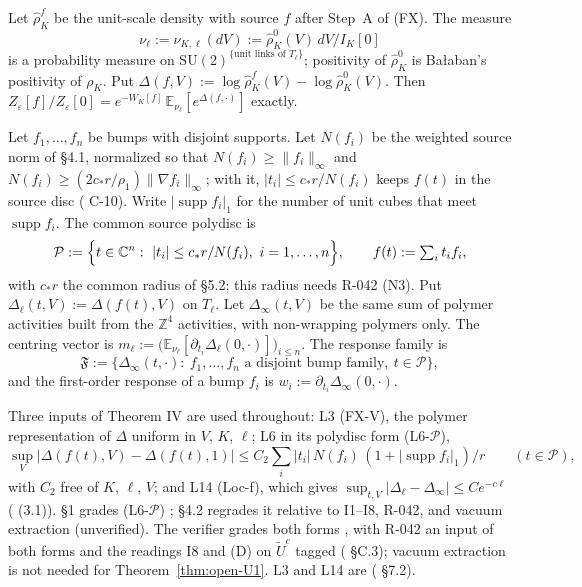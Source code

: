 \begin{definition}\label{def:open-nu}
Let $\hat\rho^f_K$ be the unit-scale density with source $f$ after Step~A of (FX). The measure
\[
\nu_\ell:=\nu_{K,\ell}(dV):=\hat\rho^0_K(V)\,dV\big/I_K[0]
\]
is a probability measure on $\mathrm{SU}(2)^{\{\text{unit links of }T_\ell\}}$; positivity of $\hat\rho^0_K$ is Ba{\l}aban's positivity of $\rho_K$. Put $\Delta(f,V):=\log\hat\rho^f_K(V)-\log\hat\rho^0_K(V)$. Then $Z_\varepsilon[f]/Z_\varepsilon[0]=e^{-W_K[f]}\,\mathbb E_{\nu_\ell}[e^{\Delta(f,\cdot)}]$ exactly.
\end{definition}

Let $f_1,\dots,f_n$ be bumps with disjoint supports. Let $N(f_i)$ be the weighted source norm of  \S4.1, normalized so that $N(f_i)\ge\|f_i\|_\infty$ and $N(f_i)\ge(2c_*r/\rho_1)\|\nabla f_i\|_\infty$; with it, $|t_i|\le c_*r/N(f_i)$ keeps $f(t)$ in the source disc ( C-10). Write $|\operatorname{supp}f_i|_1$ for the number of unit cubes that meet $\operatorname{supp}f_i$. The common source polydisc is
\[
\mathcal P:=\Bigl\{t\in\mathbb C^n:\ |t_i|\le c_*r/N(f_i),\ i=1,\dots,n\Bigr\},\qquad f(t):=\textstyle\sum_it_if_i,
\]
with $c_*r$ the common radius of  \S5.2; this radius needs R-042 (N3). Put $\Delta_\ell(t,V):=\Delta(f(t),V)$ on $T_\ell$. Let $\Delta_\infty(t,V)$ be the same sum of polymer activities built from the $\mathbb Z^4$ activities, with non-wrapping polymers only. The centring vector is $m_\ell:=\bigl(\mathbb E_{\nu_\ell}[\partial_{t_i}\Delta_\ell(0,\cdot)]\bigr)_{i\le n}$. The response family is
\[
\mathfrak F:=\bigl\{\Delta_\infty(t,\cdot):\ f_1,\dots,f_n\text{ a disjoint bump family},\ t\in\mathcal P\bigr\},
\]
and the first-order response of a bump $f_i$ is $w_i:=\partial_{t_i}\Delta_\infty(0,\cdot)$.

Three inputs of Theorem IV are used throughout: L3 (FX-V), the polymer representation of $\Delta$ uniform in $V$, $K$, $\ell$; L6 in its polydisc form (L6-$\mathcal P$),
\[
\sup_V\bigl|\Delta(f(t),V)-\Delta(f(t),1)\bigr|\le C_2\sum_i|t_i|\,N(f_i)\,(1+|\operatorname{supp}f_i|_1)/r\qquad(t\in\mathcal P),
\]
with $C_2$ free of $K$, $\ell$, $V$; and L14 (Loc-f), which gives $\sup_{t,V}|\Delta_\ell-\Delta_\infty|\le Ce^{-c\ell}$ ( (3.1)).  \S1 grades (L6-$\mathcal P$) ;  \S4.2 regrades it  relative to I1--I8, R-042, and vacuum extraction (unverified). The verifier grades both forms , with R-042 an input of both forms and the readings I8 and (D) on $\tilde U^c$ tagged  ( \S C.3); vacuum extraction is not needed for Theorem~\ref{thm:open-U1}. L3 and L14 are  ( \S7.2).

